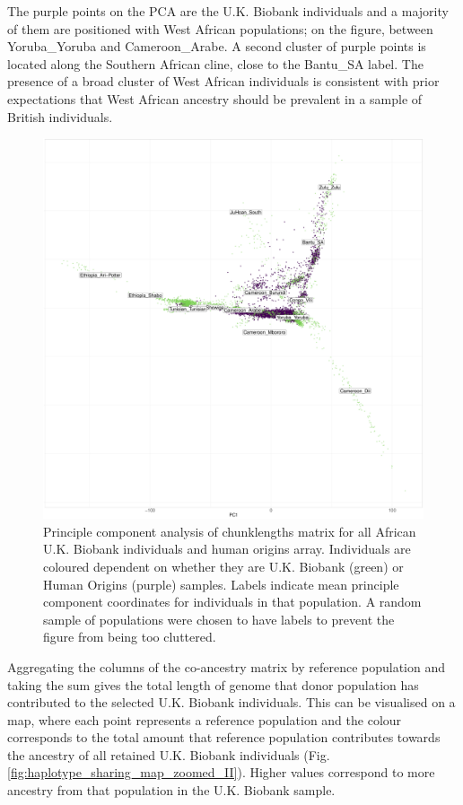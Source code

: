 The purple points on the PCA are the U.K. Biobank individuals and a majority of them are positioned with West African populations; on the figure, between Yoruba\_Yoruba and Cameroon\_Arabe. A second cluster of purple points is located along the Southern African cline, close to the Bantu\_SA label. The presence of a broad cluster of West African individuals is consistent with prior expectations that West African ancestry should be prevalent in a sample of British individuals. 

\begin{figure}[htp]
    \centering
    \includegraphics[width=1.0\textwidth]{../images/chapter3/ChromoPainter_PCA_UKB_HO.pdf}
    \caption{Principle component analysis of chunklengths matrix for all African U.K. Biobank individuals and human origins array. Individuals are coloured dependent on whether they are U.K. Biobank (green) or Human Origins (purple) samples. Labels indicate mean principle component coordinates for individuals in that population. A random sample of populations were chosen to have labels to prevent the figure from being too cluttered.}
    \label{fig:PCA_chunklengths_HumanOrigins_U.K.Biobank}
\end{figure}

Aggregating the columns of the co-ancestry matrix by reference population and taking the sum gives the total length of genome that donor population has contributed to the selected U.K. Biobank individuals. This can be visualised on a map, where each point represents a reference population and the colour corresponds to the total amount that reference population contributes towards the ancestry of all retained U.K. Biobank individuals (Fig. \ref{fig:haplotype_sharing_map_zoomed_II}). Higher values correspond to more ancestry from that population in the U.K. Biobank sample. 

